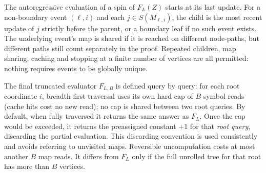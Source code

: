 \documentclass[11pt]{article}
\theoremstyle{definition}\newtheorem{definition}[theorem]{Definition}
\theoremstyle{remark}\newtheorem{remark}[theorem]{Remark}
\begin{document}
The autoregressive evaluation of a spin of \(F_L(Z)\) starts at its last update. For a non-boundary event \((\ell,i)\) and each \(j\in S(M_{\ell,i})\), the child is the most recent update of \(j\) strictly before the parent, or a boundary leaf if no such event exists. The underlying event's map is shared if it is reached on different node-paths, but different paths still count separately in the proof. Repeated children, map sharing, caching and stopping at a finite number of vertices are all permitted: nothing requires events to be globally unique.

The final truncated evaluator \(F_{L,B}\) is defined query by query: for each root coordinate \(i\), breadth-first traversal uses its own hard cap of \(B\) symbol reads (cache hits cost no new read); no cap is shared between two root queries. By default, when fully traversed it returns the same answer as \(F_L\). Once the cap would be exceeded, it returns the preassigned constant \(+1\) for that \emph{root query}, discarding the partial evaluation. This discarding convention is used consistently and avoids referring to unvisited maps. Reversible uncomputation costs at most another \(B\) map reads. It differs from \(F_L\) only if the full unrolled tree for that root has more than \(B\) vertices.
\end{document}

